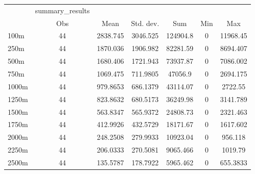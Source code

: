 
\begin{tabular}{l*{6}{c}}
\hline\hline
            &summary\_results&            &            &            &            &            \\
            &         Obs&        Mean&   Std. dev.&         Sum&         Min&         Max\\
\hline
100m        &          44&    2838.745&    3046.525&    124904.8&           0&    11968.45\\
250m        &          44&    1870.036&    1906.982&    82281.59&           0&    8694.407\\
500m        &          44&    1680.406&    1721.943&    73937.87&           0&    7086.002\\
750m        &          44&    1069.475&    711.9805&     47056.9&           0&    2694.175\\
1000m       &          44&    979.8653&    686.1379&    43114.07&           0&     2722.55\\
1250m       &          44&    823.8632&    680.5173&    36249.98&           0&    3141.789\\
1500m       &          44&    563.8347&    565.9372&    24808.73&           0&    2321.463\\
1750m       &          44&    412.9926&    432.5729&    18171.67&           0&    1617.602\\
2000m       &          44&    248.2508&    279.9933&    10923.04&           0&     956.118\\
2250m       &          44&    206.0333&    270.5081&    9065.466&           0&     1019.79\\
2500m       &          44&    135.5787&    178.7922&    5965.462&           0&    655.3833\\
\hline\hline
\end{tabular}

